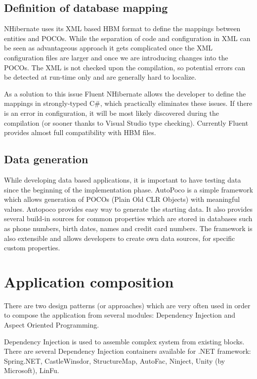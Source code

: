 \subsection{Definition of database mapping}
NHibernate uses its XML based HBM format to define the mappings between entities and POCOs. While the separation of code and configuration in XML can be seen as advantageous approach it gets complicated once the XML configuration files are larger and once we are introducing changes into the POCOs. The XML is not checked upon the compilation, so potential errors can be detected at run-time only and are generally hard to localize.

As a solution to this issue Fluent NHibernate allows the developer to define the mappings in strongly-typed C\#, which practically eliminates these issues. If there is an error in configuration, it will be most likely discovered during the compilation (or sooner thanks to Visual Studio type checking). Currently Fluent provides almost full compatibility with HBM files.

\subsection{Data generation}
While developing data based applications, it is important to have testing data since the beginning of the implementation phase. AutoPoco is a simple framework which allows generation of POCOs (Plain Old CLR Objects) with meaningful values. Autopoco provides easy way to generate the starting data. It also provides several build-in sources for common properties which are stored in databases such as phone numbers, birth dates, names and credit card numbers. The framework is also extensible and allows developers to create own data sources, for specific custom properties.

\section{Application composition}
\label{tech:di}
There are two design patterns (or approaches) which are very often used in order to compose the application from several modules: Dependency Injection and Aspect Oriented Programming.

Dependency Injection is used to assemble complex system from existing blocks. There are several Dependency Injection containers available for .NET framework: Spring.NET, CastleWinsdor, StructureMap, AutoFac, Ninject, Unity (by Microsoft), LinFu.


